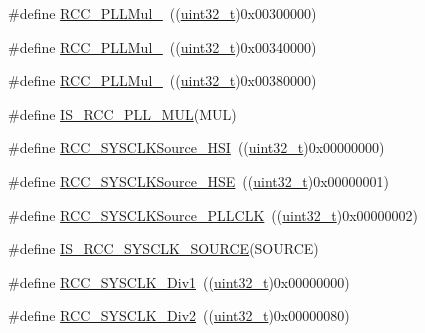 \begin{DoxyCompactItemize}
\item 
\#define \hyperlink{group___p_l_l__multiplication__factor_ga457e11adfe1e815eeb5f38de61a94328}{R\+C\+C\+\_\+\+P\+L\+L\+Mul\+\_}~((\hyperlink{_p_e___types_8h_a33594304e786b158f3fb30289278f5af}{uint32\+\_\+t})0x00300000)
\item 
\#define \hyperlink{group___p_l_l__multiplication__factor_gaad1fbc2e251391b4c469e39ccf05d642}{R\+C\+C\+\_\+\+P\+L\+L\+Mul\+\_}~((\hyperlink{_p_e___types_8h_a33594304e786b158f3fb30289278f5af}{uint32\+\_\+t})0x00340000)
\item 
\#define \hyperlink{group___p_l_l__multiplication__factor_ga98118a80e57ed822485df8a8bef3cb1f}{R\+C\+C\+\_\+\+P\+L\+L\+Mul\+\_}~((\hyperlink{_p_e___types_8h_a33594304e786b158f3fb30289278f5af}{uint32\+\_\+t})0x00380000)
\item 
\#define \hyperlink{group___p_l_l__multiplication__factor_gaad04edea77632618678f528dcb2b0cd5}{I\+S\+\_\+\+R\+C\+C\+\_\+\+P\+L\+L\+\_\+\+M\+UL}(M\+UL)
\item 
\#define \hyperlink{group___system__clock__source_ga0f392254e74dd965c48edd5aad148e20}{R\+C\+C\+\_\+\+S\+Y\+S\+C\+L\+K\+Source\+\_\+\+H\+SI}~((\hyperlink{_p_e___types_8h_a33594304e786b158f3fb30289278f5af}{uint32\+\_\+t})0x00000000)
\item 
\#define \hyperlink{group___system__clock__source_gabeae110e41833842f8620647ea0ce85a}{R\+C\+C\+\_\+\+S\+Y\+S\+C\+L\+K\+Source\+\_\+\+H\+SE}~((\hyperlink{_p_e___types_8h_a33594304e786b158f3fb30289278f5af}{uint32\+\_\+t})0x00000001)
\item 
\#define \hyperlink{group___system__clock__source_ga9301b7a07a7cb8c2c6ed87b619c1c966}{R\+C\+C\+\_\+\+S\+Y\+S\+C\+L\+K\+Source\+\_\+\+P\+L\+L\+C\+LK}~((\hyperlink{_p_e___types_8h_a33594304e786b158f3fb30289278f5af}{uint32\+\_\+t})0x00000002)
\item 
\#define \hyperlink{group___system__clock__source_gaae9d6172a72b0a90cb3703aa59258c57}{I\+S\+\_\+\+R\+C\+C\+\_\+\+S\+Y\+S\+C\+L\+K\+\_\+\+S\+O\+U\+R\+CE}(S\+O\+U\+R\+CE)
\item 
\#define \hyperlink{group___a_h_b__clock__source_gadc3ac37d90c2082d640e5948fac0878f}{R\+C\+C\+\_\+\+S\+Y\+S\+C\+L\+K\+\_\+\+Div1}~((\hyperlink{_p_e___types_8h_a33594304e786b158f3fb30289278f5af}{uint32\+\_\+t})0x00000000)
\item 
\#define \hyperlink{group___a_h_b__clock__source_gacadd82156776154a07d128b454fc69fd}{R\+C\+C\+\_\+\+S\+Y\+S\+C\+L\+K\+\_\+\+Div2}~((\hyperlink{_p_e___types_8h_a33594304e786b158f3fb30289278f5af}{uint32\+\_\+t})0x00000080)
\item 

\end{DoxyCompactItemize}
